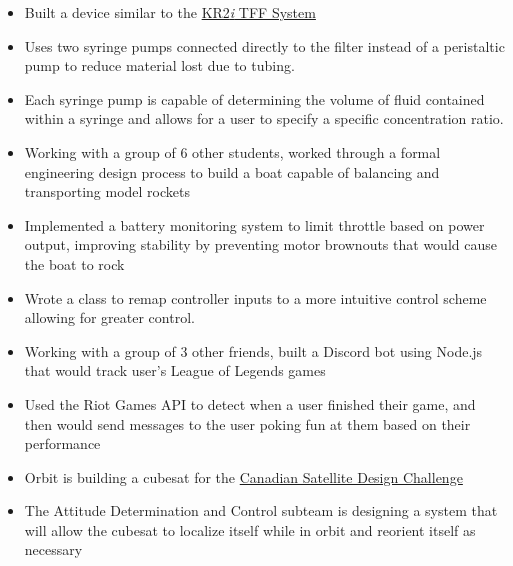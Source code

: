 \documentclass{resume}
\begin{document}
\TechnicalProjects

\begin{itemize}
    \item Built a device similar to the \href{http://spectrumlabs.com/filtration/KR2System.html}{KR2\textit{i} TFF System}
    \item Uses two syringe pumps connected directly to the filter instead of a peristaltic pump to reduce material lost due to tubing.
    \item Each syringe pump is capable of determining the volume of fluid contained within a syringe and allows for a user to specify a specific concentration ratio.
\end{itemize}

\begin{itemize}
	\item Working with a group of 6 other students, worked through a formal engineering design process to build a boat capable of balancing and transporting model rockets
	\item Implemented a battery monitoring system to limit throttle based on power output, improving stability by preventing motor brownouts that would cause the boat to rock
	\item Wrote a class to remap controller inputs to a more intuitive control scheme allowing for greater control.
\end{itemize}

\begin{itemize}
	\item Working with a group of 3 other friends, built a Discord bot using Node.js that would track user's League of Legends games
	\item Used the Riot Games API to detect when a user finished their game, and then would send messages to the user poking fun at them based on their performance
\end{itemize}

\StudentTeams

\begin{itemize}
    \item Orbit is building a cubesat for the \href{https://www.csdcms.ca/}{Canadian Satellite Design Challenge}
    \item The Attitude Determination and Control subteam is designing a system that will allow the cubesat to localize itself while in orbit and reorient itself as necessary
\end{itemize}
\end{document}
